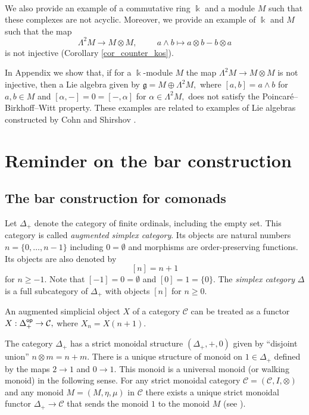 \documentclass{amsart}
\numberwithin{equation}{section}
\theoremstyle{definition}
\def\CC{\mathcal{C}}
\def\gg{\mathfrak{g}}
\def\kk{\Bbbk}
\begin{document}
\ 


We also provide an example of a commutative ring $\kk$ and a module $M$ such that these complexes are not acyclic. Moreover, we provide an example of $\kk$ and $M$ such that the map
$$\Lambda^2 M \to M\otimes M, \hspace{1cm} a\wedge b \mapsto a\otimes b - b \otimes a$$
is not injective (Corollary \ref{cor_counter_kos}). 

In Appendix we show that, if for a $\kk$-module $M$ the map $\Lambda^2 M \to M\otimes M$ is not injective, then a Lie algebra given by $\gg=M\oplus  \Lambda^2 M,$ where $[a,b]=a\wedge b$ for $a,b\in M$ and $[\alpha,-]=0=[-,\alpha]$ for $\alpha\in \Lambda^2 M,$ does not satisfy the Poincar\'e–Birkhoff–Witt property. These examples are related to examples of Lie algebras constructed by Cohn  \cite{cohn1963remark} and Shirshov \cite{shirshov1953representation}.





\section{Reminder on the bar construction} 

\subsection{The bar construction for comonads}

Let $\Delta_+$ denote the category of finite ordinals, including the empty set. This category is called {\it augmented simplex category}. Its objects are natural numbers $n=\{0,\dots,n-1\}$ including $0=\emptyset$ and morphisms are order-preserving functions. Its objects are also denoted by $$[n]=n+1$$ for $n\geq -1.$ Note that $[-1]=0=\emptyset$ and $[0]=1=\{0\}.$ The \emph{simplex category} $\Delta$ is a full subcategory of $\Delta_+$ with objects $[n]$ for $n\geq 0.$ 

An augmented simplicial object $X$ of a category $\CC$ can be treated as a functor $X:\Delta_+^{\sf op}\to \CC,$ where  $X_n=X(n+1).$


The category $\Delta_+$ has a  strict monoidal structure $(\Delta_+,+,0)$ given by ``disjoint union'' $n\otimes m=n+m.$ There is a unique structure of monoid on $1\in \Delta_+$ defined by the maps $2\to 1$ and $0\to 1.$ This monoid is a universal monoid (or walking monoid) in the following sense. 
For any strict monoidal category $\CC=(\CC,I,\otimes)$ and any monoid $M=(M,\eta,\mu)$ in $ \CC$ there exists a unique strict monoidal functor $\Delta_+ \to  \CC$ that sends the monoid $1$ to the monoid $M$ (see 
\cite[Ch. VII, \S 5]{mclane1971categories}).
\end{document}
